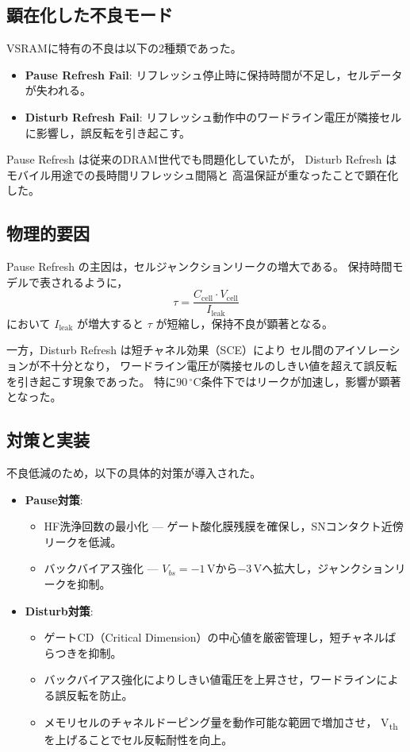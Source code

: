 \documentclass[conference]{IEEEtran}
\begin{document}
\subsection{顕在化した不良モード}
VSRAMに特有の不良は以下の2種類であった。
\begin{itemize}
  \item \textbf{Pause Refresh Fail}: リフレッシュ停止時に保持時間が不足し，セルデータが失われる。
  \item \textbf{Disturb Refresh Fail}: リフレッシュ動作中のワードライン電圧が隣接セルに影響し，誤反転を引き起こす。
\end{itemize}

Pause Refresh は従来のDRAM世代でも問題化していたが，
Disturb Refresh はモバイル用途での長時間リフレッシュ間隔と
高温保証が重なったことで顕在化した。

\subsection{物理的要因}
Pause Refresh の主因は，セルジャンクションリークの増大である。
保持時間モデルで表されるように，
\[
\tau = \frac{C_{\mathrm{cell}} \cdot V_{\mathrm{cell}}}{I_{\mathrm{leak}}}
\]
において $I_{\mathrm{leak}}$ が増大すると $\tau$ が短縮し，保持不良が顕著となる。

一方，Disturb Refresh は短チャネル効果（SCE）により
セル間のアイソレーションが不十分となり，
ワードライン電圧が隣接セルのしきい値を超えて誤反転を引き起こす現象であった。
特に90\,$^\circ$C条件下ではリークが加速し，影響が顕著となった。

\subsection{対策と実装}
不良低減のため，以下の具体的対策が導入された。
\begin{itemize}
  \item \textbf{Pause対策}:
    \begin{itemize}
      \item HF洗浄回数の最小化 — ゲート酸化膜残膜を確保し，SNコンタクト近傍リークを低減。
      \item バックバイアス強化 — $V_{bs}=-1$\,Vから$-3$\,Vへ拡大し，ジャンクションリークを抑制。
    \end{itemize}
  \item \textbf{Disturb対策}:
    \begin{itemize}
      \item ゲートCD（Critical Dimension）の中心値を厳密管理し，短チャネルばらつきを抑制。
      \item バックバイアス強化によりしきい値電圧を上昇させ，ワードラインによる誤反転を防止。
      \item メモリセルのチャネルドーピング量を動作可能な範囲で増加させ，
            V\textsubscript{th} を上げることでセル反転耐性を向上。
    \end{itemize}
\end{itemize}
\end{document}
